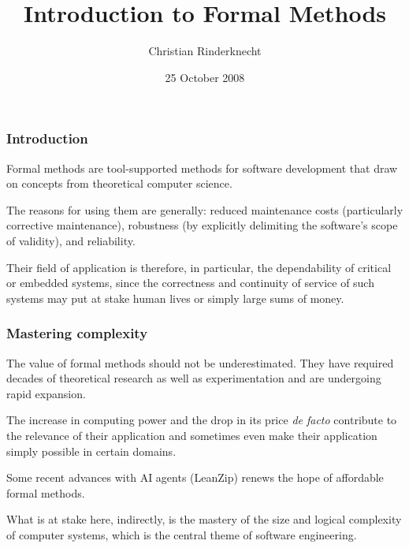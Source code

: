 \documentclass[compress,dvipdfmx]{beamer}
\title{Introduction to Formal Methods}
\author{Christian Rinderknecht}
\date{25 October 2008}
\begin{document}
\frame{\maketitle}

%
\begin{frame}
  \frametitle{Introduction}

  Formal methods are tool-supported methods for software development
  that draw on concepts from theoretical computer science.

  \bigskip

  The reasons for using them are generally: reduced maintenance costs
  (particularly corrective maintenance), robustness (by explicitly
  delimiting the software's scope of validity), and reliability.

  \bigskip

  Their field of application is therefore, in particular, the
  dependability of critical or embedded systems, since the correctness
  and continuity of service of such systems may put at stake human
  lives or simply large sums of money.

\end{frame}

%
\begin{frame}
  \frametitle{Mastering complexity}

  The value of formal methods should not be underestimated.  They have
  required decades of theoretical research as well as experimentation
  and are undergoing rapid expansion.

  \bigskip

  The increase in computing power and the drop in its price \emph{de
  facto} contribute to the relevance of their application and
  sometimes even make their application simply possible in certain
  domains.

  \bigskip

  Some recent advances with AI agents (LeanZip) renews the hope of
  affordable formal methods.

  \bigskip

  What is at stake here, indirectly, is the mastery of the size and
  logical complexity of computer systems, which is the central theme
  of software engineering.

\end{frame}
\end{document}
